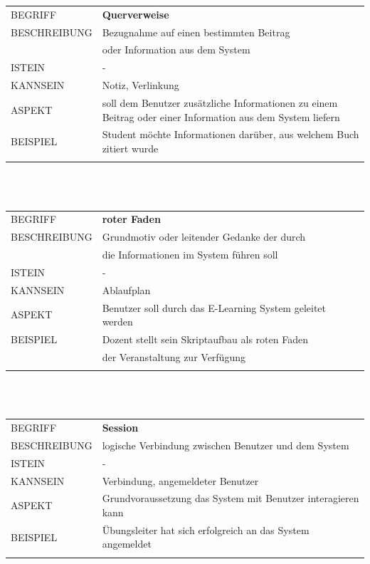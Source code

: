 \documentclass[12pt,a4paper]{article}
\begin{document}
\begin{tabular}{l p{12cm}}
	BEGRIFF 	 & \textbf{Querverweise} \\ 
	BESCHREIBUNG & Bezugnahme auf einen bestimmten Beitrag\\
	& oder Information aus dem System\\ 
	ISTEIN   	 & - \\
	KANNSEIN 	 & Notiz, Verlinkung\\ 
	ASPEKT   	 & soll dem Benutzer zusätzliche Informationen zu einem Beitrag 				   oder einer Information aus dem System liefern\\
	BEISPIEL 	 & Student möchte Informationen darüber, aus welchem Buch zitiert wurde\\\\
	\hline
\end{tabular}\\\\  

\begin{tabular}{l p{12cm}}
	BEGRIFF 	 & \textbf{roter Faden} \\ 
	BESCHREIBUNG & Grundmotiv oder leitender Gedanke der durch\\
	&  die Informationen im System führen soll\\ 
	ISTEIN   	 & - \\
	KANNSEIN 	 & Ablaufplan \\ 
	ASPEKT   	 & Benutzer soll durch das E-Learning System geleitet werden\\
	BEISPIEL 	 & Dozent stellt sein Skriptaufbau als roten Faden\\
	& der Veranstaltung zur Verfügung\\\\
	\hline
\end{tabular}\\\\  

\begin{tabular}{l p{12cm}}
	BEGRIFF 	 & \textbf{Session} \\ 
	BESCHREIBUNG & logische Verbindung zwischen Benutzer und dem System\\ 
	ISTEIN   	 & -\\
	KANNSEIN 	 & Verbindung, angemeldeter Benutzer\\ 
	ASPEKT   	 & Grundvoraussetzung das System mit Benutzer interagieren kann\\
	BEISPIEL 	 & Übungsleiter hat sich erfolgreich an das System angemeldet\\\\
	\hline
\end{tabular}\\\\  
\end{document}
